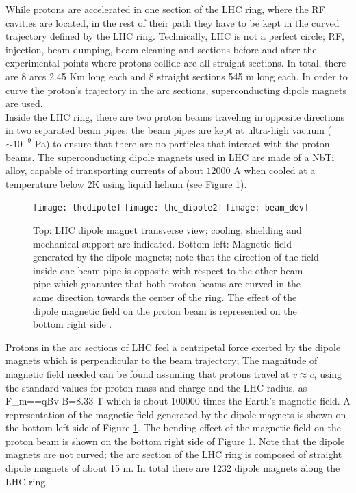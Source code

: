 \noindent While protons are accelerated in one section of the LHC ring, where the RF cavities are located, in the rest of their path they have to be kept in the curved trajectory defined by the LHC ring. Technically, LHC is not a perfect circle; RF, injection, beam dumping, beam cleaning and sections before and after the experimental points where protons collide are all straight sections. In total, there are 8 arcs 2.45 Km long each and 8 straight sections 545 m long each. In order to curve the proton's trajectory in the arc sections, superconducting dipole magnets are used.\\               

\noindent Inside the LHC ring, there are two proton beams traveling in opposite directions in two separated beam pipes; the beam pipes are kept at ultra-high vacuum ($\sim 10^{-9}$ Pa) to ensure that there are no particles that interact with the proton beams. The superconducting dipole magnets used in LHC are made of a NbTi alloy, capable of transporting currents of about $12000$ A when cooled at a temperature below 2K using liquid helium (see Figure \ref{fig:lhcdipole}).\\

\begin{figure}[!h]
\centering
\texttt{[image: lhcdipole]}
\texttt{[image: lhc\_dipole2]}
\texttt{[image: beam\_dev]}
\caption [LHC dipole magnet.]{Top: LHC dipole magnet transverse view; cooling, shielding and mechanical support are indicated. Bottom left: Magnetic field generated by the dipole magnets; note that the direction of the field inside one beam pipe is opposite with respect to the other beam pipe which guarantee that both proton beams are curved in the same direction towards the center of the ring. The effect of the dipole magnetic field on the proton beam is represented on the bottom right side \cite{lhc_dipole, dipole_field,video}.}\label{fig:lhcdipole}
\end{figure}

\noindent Protons in the arc sections of LHC feel a centripetal force exerted by the dipole magnets which is perpendicular to the beam trajectory; The magnitude of magnetic field needed can be found assuming that protons travel at $v \approx c$, using the standard values for proton mass and charge and the LHC radius, as
\beqn
F_m==qBv \quad \to B=8.33 T
\eeqn
\noindent which is about 100000 times the Earth's magnetic field. A representation of the magnetic field generated by the dipole magnets is shown on the bottom left side of Figure \ref{fig:lhcdipole}. The bending effect of the magnetic field on the proton beam is shown on the bottom right side of Figure \ref{fig:lhcdipole}. Note that the dipole magnets are not curved; the arc section of the LHC ring is composed of straight dipole magnets of about 15 m. In total there are 1232 dipole magnets along the LHC ring.\\

